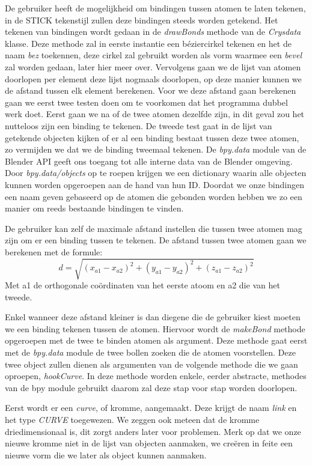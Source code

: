 De gebruiker heeft de mogelijkheid om bindingen tussen atomen te laten tekenen, in de {STICK} tekenstijl zullen deze bindingen steeds worden getekend. Het tekenen van bindingen wordt gedaan in de \textit{drawBonds} methode van de \textit{Crysdata} klasse. Deze methode zal in eerste instantie een béziercirkel tekenen en het de naam \textit{bez} toekennen, deze cirkel zal gebruikt worden als vorm waarmee een \textit{bevel} zal worden gedaan, later hier meer over. Vervolgens gaan we de lijst van atomen doorlopen per element deze lijst nogmaals doorlopen, op deze manier kunnen we de afstand tussen elk element berekenen. Voor we deze afstand gaan berekenen gaan we eerst twee testen doen om te voorkomen dat het programma dubbel werk doet. Eerst gaan we na of de twee atomen dezelfde zijn, in dit geval zou het nutteloos zijn een binding te tekenen. De tweede test gaat in de lijst van getekende objecten kijken of er al een binding bestaat tussen deze twee atomen, zo vermijden we dat we de binding tweemaal tekenen. De \textit{bpy.data} module van de Blender API geeft ons toegang tot alle interne data van de Blender omgeving. Door \textit{bpy.data/objects} op te roepen krijgen we een dictionary waarin alle objecten kunnen worden opgeroepen aan de hand van hun ID. Doordat we onze bindingen een naam geven gebaseerd op de atomen die gebonden worden hebben we zo een manier om reeds bestaande bindingen te vinden.
\par
De gebruiker kan zelf de maximale afstand instellen die tussen twee atomen mag zijn om er een binding tussen te tekenen. De afstand tussen twee atomen gaan we berekenen met de formule:
\[ d = \sqrt{(x_{a1}-x_{a2})^2+(y_{a1}-y_{a2})^2+(z_{a1}-z_{a2})^2}\]   
Met a1 de orthogonale coördinaten van het eerste atoom en a2 die van het tweede.
\par
Enkel wanneer deze afstand kleiner is dan diegene die de gebruiker kiest moeten we een binding tekenen tussen de atomen. Hiervoor wordt de \textit{makeBond} methode opgeroepen met de twee te binden atomen als argument. Deze methode gaat eerst met de \textit{bpy.data} module de twee bollen zoeken die de atomen voorstellen. Deze twee object zullen dienen als argumenten van de volgende methode die we gaan oproepen, \textit{hookCurve}. In deze methode worden enkele, eerder abstracte, methodes van de bpy module gebruikt daarom zal deze stap voor stap worden doorlopen.



Eerst wordt er een \textit{curve}, of kromme,  aangemaakt. Deze krijgt de naam \textit{link} en het type \textit{CURVE} toegewezen. We zeggen ook meteen dat de kromme driedimensionaal is, dit zorgt anders later voor problemen. Merk op dat we onze nieuwe kromme niet in de lijst van objecten aanmaken, we creëren in feite een nieuwe vorm die we later als object kunnen aanmaken. 

